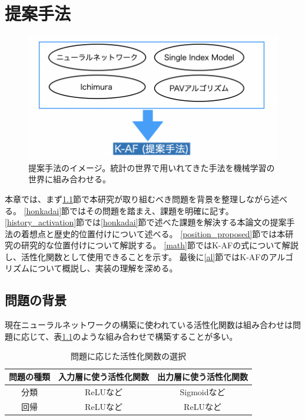 \chapter{提案手法}
\label{proposed}



\begin{figure}[hbtp]
\includegraphics[width=15cm]{asset/proposed_method.png}
	\caption{提案手法のイメージ。統計の世界で用いれてきた手法を機械学習の世界に組み合わせる。}
	\label{proposed_method}
\end{figure}

本章では、まず\ref{mondai}節で本研究が取り組むべき問題を背景を整理しながら述べる。
\ref{honkadai}節ではその問題を踏まえ、課題を明確に記す。
\ref{history_activation}節では\ref{honkadai}節で述べた課題を解決する本論文の提案手法の着想点と歴史的位置付けについて述べる。
\ref{position_proposed}節では本研究の研究的な位置付けについて解説する。
\ref{math}節ではK-AFの式について解説し、活性化関数として使用できることを示す。
最後に\ref{al}節ではK-AFのアルゴリズムについて概説し、実装の理解を深める。




\section{問題の背景}
\label {mondai}


現在ニューラルネットワークの構築に使われている活性化関数は組み合わせは問題に応じて、表\ref{which_to_use}のような組み合わせで構築することが多い。

\begin{table}[htbp]
\label{exp:iris}
    \begin{center}
        \caption{問題に応じた活性化関数の選択}
        \label{which_to_use}
        \vspace{2mm} 
        \begin{tabular}{ |c|c|c| }
        \hline
        問題の種類 & 入力層に使う活性化関数 & 出力層に使う活性化関数\\
        \hline
        分類  & ReLUなど & Sigmoidなど \\
        \hline
        回帰  & ReLUなど & ReLUなど \\
        \hline
        \end{tabular}
    \end{center}
\end{table}

